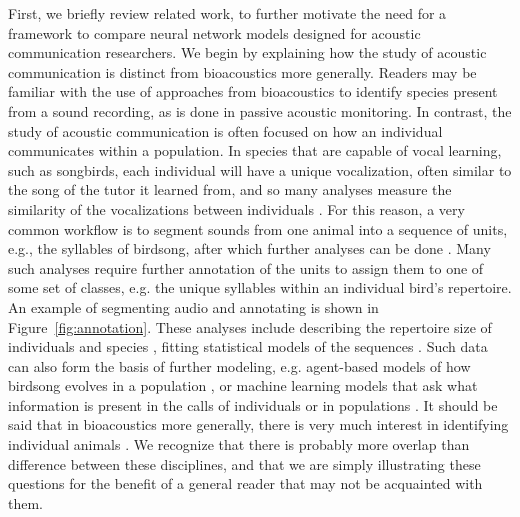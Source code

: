 First, we briefly review related work, to further motivate the need for a framework to compare neural network models designed for acoustic communication researchers. We begin by explaining how the study of acoustic communication is distinct from bioacoustics more generally. Readers may be familiar with the use of approaches from bioacoustics to identify species present from a sound recording, as is done in passive acoustic monitoring. In contrast, the study of acoustic communication is often focused on how an individual communicates within a population. In species that are capable of vocal learning, such as songbirds, each individual will have a unique vocalization, often similar to the song of the tutor it learned from, and so many analyses measure the similarity of the vocalizations between individuals \cite{tchernichovskiProcedureAutomatedMeasurement2000, kershenbaumQuantifyingSimilarityAnimal2015}. For this reason, a very common workflow is to segment sounds from one animal into a sequence of units, e.g., the syllables of birdsong, after which further analyses can be done \cite{kershenbaumAcousticSequencesNonhuman2016}. Many such analyses require further annotation of the units to assign them to one of some set of classes, e.g. the unique syllables within an individual bird's repertoire. An example of segmenting audio and annotating is shown in
Figure~\ref{fig:annotation}. These analyses include describing the repertoire size of individuals and species \cite{robinsonSpecieslevelRepertoireSize2019, elieVocalRepertoireDomesticated2016}, fitting statistical models of the sequences \cite{markowitz_long-range_2013, kakishitaEthologicalDataMining2009}. Such data can also form the basis of further modeling, e.g. agent-based models of how birdsong evolves in a population \cite{youngbloodContentBiasCultural2022, hudsonModelingHowPopulation2022}, or machine learning models that ask what information is present in the calls of individuals \cite{smith-vidaurreIndividualSignaturesOutweigh2020, pratEverydayBatVocalizations2016} or in populations \cite{barkerCulturalTransmissionVocal2021,petersonUnsupervisedDiscoveryFamily2023}. It should be said that in bioacoustics more generally, there is very much interest in identifying individual animals \cite{linhartPotentialAcousticIndividual2022}. We recognize that there is probably more overlap than difference between these disciplines, and that we are simply illustrating these questions for the benefit of a general reader that may not be acquainted with them.

